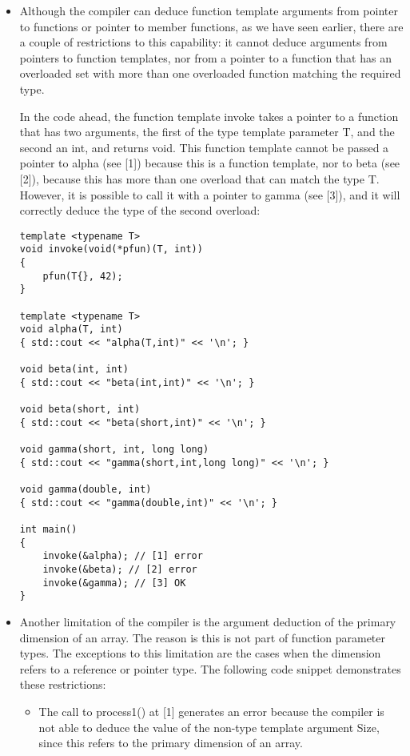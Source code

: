 \begin{itemize}
\item
Although the compiler can deduce function template arguments from pointer to functions or pointer to member functions, as we have seen earlier, there are a couple of restrictions to this capability: it cannot deduce arguments from pointers to function templates, nor from a pointer to a function that has an overloaded set with more than one overloaded function matching the required type.

In the code ahead, the function template invoke takes a pointer to a function that has two arguments, the first of the type template parameter T, and the second an int, and returns void. This function template cannot be passed a pointer to alpha (see [1]) because this is a function template, nor to beta (see [2]), because this has more than one overload that can match the type T. However, it is possible to call it with a pointer to gamma (see [3]), and it will correctly deduce the type of the second overload:

\begin{lstlisting}[style=styleCXX]
template <typename T>
void invoke(void(*pfun)(T, int))
{
	pfun(T{}, 42);
}

template <typename T>
void alpha(T, int)
{ std::cout << "alpha(T,int)" << '\n'; }

void beta(int, int)
{ std::cout << "beta(int,int)" << '\n'; }

void beta(short, int)
{ std::cout << "beta(short,int)" << '\n'; }

void gamma(short, int, long long)
{ std::cout << "gamma(short,int,long long)" << '\n'; }

void gamma(double, int)
{ std::cout << "gamma(double,int)" << '\n'; }

int main()
{
	invoke(&alpha); // [1] error
	invoke(&beta); // [2] error
	invoke(&gamma); // [3] OK
}
\end{lstlisting}

\item
Another limitation of the compiler is the argument deduction of the primary dimension of an array. The reason is this is not part of function parameter types. The exceptions to this limitation are the cases when the dimension refers to a reference or pointer type. The following code snippet demonstrates these restrictions:

\begin{itemize}
\item
The call to process1() at [1] generates an error because the compiler is not able to deduce the value of the non-type template argument Size, since this refers to the primary dimension of an array.


\end{itemize}
\end{itemize}
